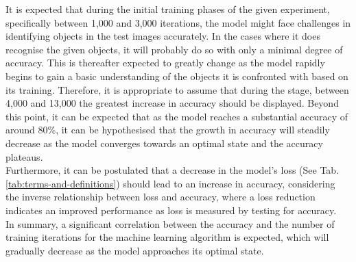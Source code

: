 It is expected that during the initial training phases of the given experiment, specifically between 1,000 and 3,000 iterations, the model might face challenges in identifying objects in the test images accurately. In the cases where it does recognise the given objects, it will probably do so with only a minimal degree of accuracy. This is thereafter expected to greatly change as the model rapidly begins to gain a basic understanding of the objects it is confronted with based on its training. Therefore, it is appropriate to assume that during the stage, between  4,000 and 13,000 the greatest increase in accuracy should be displayed.  Beyond this point, it can be expected that as the model reaches a substantial accuracy of around 80\%, it can be hypothesised that the growth in accuracy will steadily decrease as the model converges towards an optimal state and the accuracy plateaus.\\


Furthermore, it can be postulated that a decrease in the model's loss (See Tab. \ref{tab:terms-and-definitions}) should lead to an increase in accuracy, considering the inverse relationship between loss and accuracy, where a loss reduction indicates an improved performance as loss is measured by testing for accuracy.\\


In summary, a significant correlation between the accuracy and the number of training iterations for the machine learning algorithm is expected, which will gradually decrease as the model approaches its optimal state.


